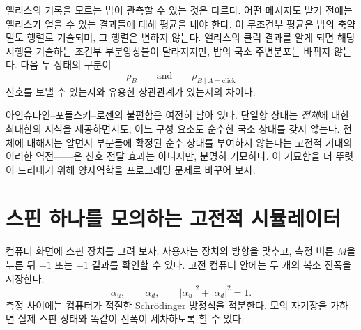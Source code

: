 앨리스의 기록을 모르는 밥이 관측할 수 있는 것은 다르다. 어떤 메시지도 받기 전에는 앨리스가 얻을 수 있는 결과들에 대해 평균을 내야 한다. 이 무조건부 평균은 밥의 축약 밀도 행렬로 기술되며, 그 행렬은 변하지 않는다. 앨리스의 클릭 결과를 알게 되면 해당 시행을 기술하는 조건부 부분앙상블이 달라지지만, 밥의 국소 주변분포는 바뀌지 않는다. 다음 두 상태의 구분이
\begin{equation}
\rho_B
\qquad\text{and}\qquad
\rho_{B\mid A=\text{click}}
\end{equation}
신호를 보낼 수 있는지와 유용한 상관관계가 있는지의 차이다.

\begin{classroomqa}
\end{classroomqa}

\begin{classroomqa}
\end{classroomqa}

아인슈타인--포돌스키--로젠의 불편함은 여전히 남아 있다. 단일항 상태는 \emph{전체}에 대한 최대한의 지식을 제공하면서도, 어느 구성 요소도 순수한 국소 상태를 갖지 않는다. 전체에 대해서는 알면서 부분들에 확정된 순수 상태를 부여하지 않는다는 고전적 기대의 이러한 역전------은 신호 전달 효과는 아니지만, 분명히 기묘하다. 이 기묘함을 더 뚜렷이 드러내기 위해 양자역학을 프로그래밍 문제로 바꾸어 보자.

\section{스핀 하나를 모의하는 고전적 시뮬레이터}

컴퓨터 화면에 스핀 장치를 그려 보자. 사용자는 장치의 방향을 맞추고, 측정 버튼 \(M\)을 누른 뒤 \(+1\) 또는 \(-1\) 결과를 확인할 수 있다. 고전 컴퓨터 안에는 두 개의 복소 진폭을 저장한다.
\begin{equation}
\alpha_u,\qquad \alpha_d,
\qquad
|\alpha_u|^2+|\alpha_d|^2=1.
\label{eq:l8-one-spin-amplitudes}
\end{equation}
측정 사이에는 컴퓨터가 적절한 Schr\"odinger 방정식을 적분한다. 모의 자기장을 가하면 실제 스핀 상태와 똑같이 진폭이 세차하도록 할 수 있다.

